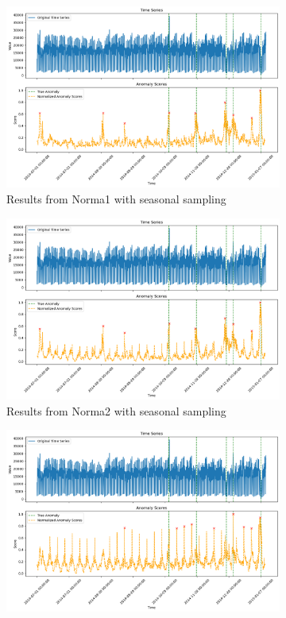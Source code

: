 \documentclass[11pt]{article}
\begin{document}
\begin{figure}[h]
    \begin{subfigure}[b]{0.5\textwidth}
        \includegraphics[width=\textwidth]{algo1.png}
        \caption{Results from Norma1 with seasonal sampling}
        \label{fig:algo1}
    \end{subfigure}
    \hfill
    \begin{subfigure}[b]{0.5\textwidth}
        \includegraphics[width=\textwidth]{algo2.png}
        \caption{Results from Norma2 with seasonal sampling}
        \label{fig:algo2}
    \end{subfigure}
    \begin{subfigure}[b]{0.5\textwidth}
        \includegraphics[width=\textwidth]{algo3.png}

\end{subfigure}
\end{figure}
\end{document}
